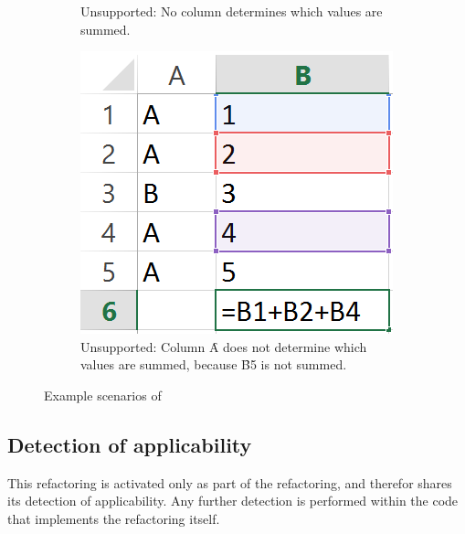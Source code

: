 \begin{figure}
\begin{subfigure}[t]{0.25\textwidth}
		\caption{Unsupported: \newline No column determines which values are summed.}
		\label{fig:introcondaggrScenario2}
	\end{subfigure}
	\hspace{0.05\textwidth}
	\begin{subfigure}[t]{0.25\textwidth}
		\includegraphics[width=\textwidth]{implementation/aggregate/scenario3}
		\caption{Unsupported: \newline Column \f{A} does not determine which values are summed, because \f{B5} is not summed.}
		\label{fig:introcondaggrScenario3}
	\end{subfigure}
	\caption{Example scenarios of }
	\label{fig:introcondaggrScenario}
\end{figure}

\subsection{Detection of applicability}

This refactoring is activated only as part of the  refactoring, and therefor shares its detection of applicability.
Any further detection is performed within the code that implements the refactoring itself.

%
%
%
%